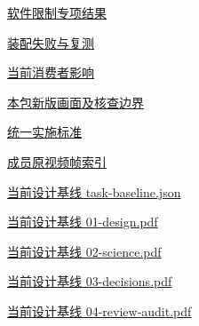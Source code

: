 \documentclass[11pt,a4paper]{article}
\begin{document}
\href{file:///D:/Agent/srp/agent/tasks/X-03/evidence/verification.json}{软件限制专项结果}


\href{file:///D:/Agent/srp/agent/tasks/X-03/evidence/initial-failure-disposition.md}{装配失败与复测}


\href{file:///D:/Agent/srp/agent/tasks/X-03/evidence/consumer-impact.md}{当前消费者影响}


\href{file:///D:/Agent/srp/agent/tasks/X-03/outputs/current-implementation-evidence.md}{本包新版画面及核查边界}


\href{file:///D:/Agent/srp/agent/design/weather/2026-10-08_Storm\%E4\%B8\%8E\%E7\%BA\%AF\%E7\%B2\%92\%E5\%AD\%90\%E5\%8F\%8C\%E7\%8E\%AF\%E5\%AE\%9E\%E6\%96\%BD\%E6\%A0\%87\%E5\%87\%86.md}{统一实施标准}


\href{file:///D:/Agent/srp/human/assets/previews/2026-10-08/member-storm-particle-rings/frame-index.json}{成员原视频帧索引}


\href{file:///D:/Agent/srp/agent/design/design-foundation-20261008/task-baseline.json}{当前设计基线 task-\allowbreak{}baseline.json}


\href{file:///D:/Agent/srp/agent/design/design-foundation-20261008/01-design.pdf}{当前设计基线 01-\allowbreak{}design.pdf}


\href{file:///D:/Agent/srp/agent/design/design-foundation-20261008/02-science.pdf}{当前设计基线 02-\allowbreak{}science.pdf}


\href{file:///D:/Agent/srp/agent/design/design-foundation-20261008/03-decisions.pdf}{当前设计基线 03-\allowbreak{}decisions.pdf}


\href{file:///D:/Agent/srp/agent/design/design-foundation-20261008/04-review-audit.pdf}{当前设计基线 04-\allowbreak{}review-\allowbreak{}audit.pdf}
\end{document}
